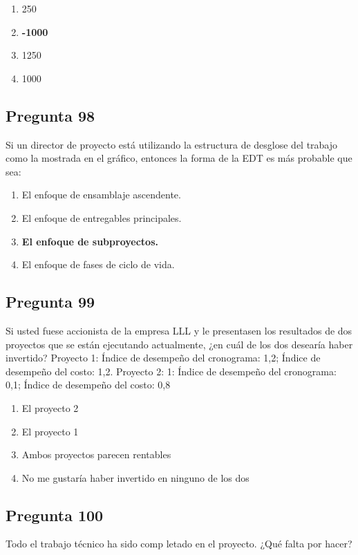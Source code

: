 \documentclass[11pt,a4paper]{article}
\begin{document}
\begin{enumerate}[label=\alph*)]
  \item 250
  \item \textbf{-1000}
  \item 1250
  \item 1000
\end{enumerate}

\subsection*{Pregunta 98}
Si un director de proyecto está utilizando la estructura de desglose del trabajo como la mostrada en el gráfico, entonces la forma de la EDT es más probable que sea:

\begin{enumerate}[label=\alph*)]
  \item El enfoque de ensamblaje ascendente.
  \item El enfoque de entregables principales.
  \item \textbf{El enfoque de subproyectos.}
  \item El enfoque de fases de ciclo de vida.
\end{enumerate}

\subsection*{Pregunta 99}
Si usted fuese accionista de la empresa LLL y le presentasen los resultados de dos proyectos que se están ejecutando actualmente, ¿en cuál de los dos desearía haber invertido? Proyecto 1: Índice de desempeño del cronograma: 1,2; Índice de desempeño del costo: 1,2. Proyecto 2: 1: Índice de desempeño del cronograma: 0,1; Índice de desempeño del costo: 0,8

\begin{enumerate}[label=\alph*)]
  \item El proyecto 2
  \item El proyecto 1
  \item Ambos proyectos parecen rentables
  \item No me gustaría haber invertido en ninguno de los dos
\end{enumerate}

\subsection*{Pregunta 100}
Todo el trabajo técnico ha sido comp letado en el proyecto. ¿Qué falta por hacer?
\end{document}
